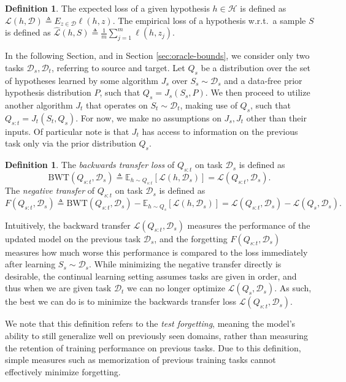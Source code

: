 \documentclass{article}
\theoremstyle{plain}
\theoremstyle{definition}
\newtheorem{definition}[theorem]{Definition}
\theoremstyle{remark}
\begin{document}
\begin{definition}
	The expected loss of a given hypothesis $h\in \mathcal{H}$ is defined as $\mathcal{L}(h, \mathcal{D}) \triangleq E_{z\in \mathcal{D}} \ell(h, z)$. The empirical loss of a hypothesis w.r.t.~a sample $S$ is defined as $\hat{\mathcal{L}}(h, S) \triangleq \frac{1}{m}\sum_{j=1}^{m}\ell(h, z_j)$.
\end{definition}

In the following Section, and in Section \ref{sec:oracle-bounds}, we consider only two tasks $\mathcal{D}_s, \mathcal{D}_t$, referring to source and target. Let $Q_s$ be a distribution over the set of hypotheses learned by some algorithm $J_s$ over $S_s\sim \mathcal{D}_s$ and a data-free prior hypothesis distribution $P$, such that $Q_s=J_s(S_s, P).$ We then proceed to utilize another algorithm $J_t$ that operates on $S_t\sim \mathcal{D}_t$, making use of $Q_s$, such that 
$Q_{s:t}=J_t(S_t, Q_s).$  
For now, we make no assumptions on $J_s,J_t$ other than their inputs. Of particular note is that $J_t$ has access to information on the previous task only via the prior distribution $Q_s$.

\begin{definition}
	The \emph{backwards transfer loss} of $Q_{s:t}$ on task $\mathcal{D}_s$ is defined as $$\mathrm{BWT}(Q_{s:t}, \mathcal{D}_s) \triangleq \mathbb{E}_{h\sim Q_{s:t}}\left [\mathcal{L}(h, \mathcal{D}_s)\right ]=\mathcal{L}(Q_{s:t}, \mathcal{D}_s).$$
	The \emph{negative transfer} of $Q_{s:t}$ on task $\mathcal{D}_s$ is defined as $$F(Q_{s:t}, \mathcal{D}_s) \triangleq \mathrm{BWT}(Q_{s:t}, \mathcal{D}_s) - \mathbb{E}_{h\sim Q_{s}}\left [\mathcal{L}(h, \mathcal{D}_s)\right ]=\mathcal{L}(Q_{s:t}, \mathcal{D}_s)-\mathcal{L}(Q_{s}, \mathcal{D}_s).$$
\end{definition}
Intuitively, the backward transfer $\mathcal{L}(Q_{s:t}, \mathcal{D}_s)$ measures the performance of the updated model on the previous task $\mathcal{D}_s$, and the forgetting $F(Q_{s:t}, \mathcal{D}_s)$ measures how much worse this performance is compared to the loss immediately after learning $S_s\sim\mathcal{D}_s$. While minimizing the negative transfer directly is desirable, the continual learning setting assumes tasks are given in order, and thus when we are given task $\mathcal{D}_t$ we can no longer optimize $\mathcal{L}(Q_{s}, \mathcal{D}_s)$. As such, the best we can do is to minimize the backwards transfer loss $\mathcal{L}(Q_{s:t}, \mathcal{D}_s)$.

We note that this definition refers to the \emph{test forgetting}, meaning the model's ability to still generalize well on previously seen domains, rather than measuring the retention of training performance on previous tasks. Due to this definition, simple measures such as memorization of previous training tasks cannot effectively minimize forgetting.
\end{document}
